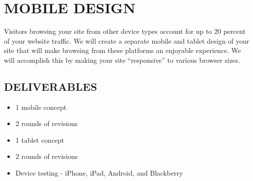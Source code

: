 \documentclass[12pt]{report}
\begin{document}
\section{MOBILE DESIGN}
\item Visitors browsing your site from other device types account for up to 20 percent  of your website traffic. We will create a separate mobile and tablet design of your site that will make browsing from these platforms an enjoyable experience. We will accomplish this by making your site “responsive” to various browser sizes.
\subsection{DELIVERABLES}
\begin{itemize}
\item 1 mobile concept
\item 2 rounds of revisions
\item 1 tablet concept
\item 2 rounds of revisions
\item Device testing - iPhone, iPad, Android, and Blackberry
\end{itemize}
\end{document}
